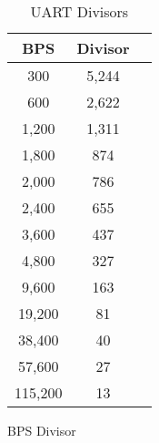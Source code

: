 \begin{table}[h]
    \begin{center}
        \begin{tabular}{|c|c|c|} \hline
            BPS & Divisor \\ \hline\hline
            300 & 5,244 \\ \hline
            600 & 2,622 \\ \hline
            1,200 & 1,311 \\ \hline
            1,800 & 874 \\ \hline
            2,000 & 786 \\ \hline
            2,400 & 655 \\ \hline
            3,600 & 437 \\ \hline
            4,800 & 327 \\ \hline
            9,600 & 163 \\ \hline
            19,200 & 81 \\ \hline
            38,400 & 40 \\ \hline
            57,600 & 27 \\ \hline
            115,200 & 13 \\ \hline
        \end{tabular}
    \end{center}
    \caption{UART Divisors}
    \label{tab:uart_divisors}
\end{table}

BPS	Divisor
